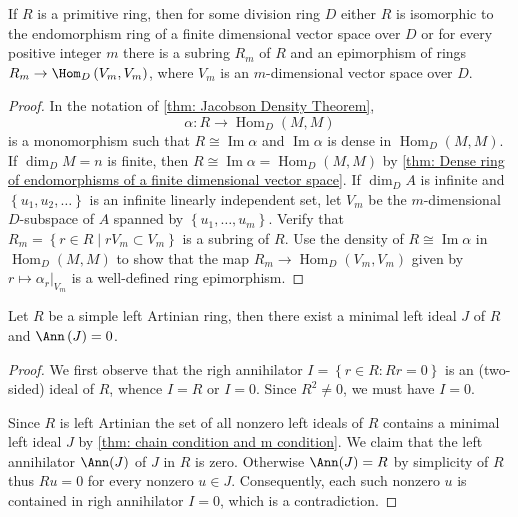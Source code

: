 \begin{corollary}
    \label{cor: Structure of primitive rings}
    If $R$ is a primitive ring, then for some division ring $D$ either $R$ is isomorphic to the endomorphism ring of a finite dimensional vector space over $D$
    or
    for every positive integer $m$ there is a subring $R_{m}$ of $R$ and an epimorphism of rings $R_{m} \rightarrow \Hom_{D}\left(V_{m}, V_{m}\right)$, where $V_{m}$ is an $m$-dimensional vector space over $D$.

    \begin{proof}
        In the notation of \ref{thm: Jacobson Density Theorem},
        \begin{equation*}
            \alpha: R \rightarrow \operatorname{Hom}_D(M, M)
        \end{equation*}
        is a monomorphism such that $R\cong\operatorname{Im} \alpha$ and $\operatorname{Im} \alpha$ is dense in $\operatorname{Hom}_D(M, M)$.
        If $\operatorname{dim}_D M=n$ is finite, then $R\cong \operatorname{Im} \alpha=\operatorname{Hom}_D(M, M)$ by \ref{thm: Dense ring of endomorphisms of a finite dimensional vector space}.
        If $\operatorname{dim}_D A$ is infinite and $\left\{u_1, u_2, \ldots\right\}$ is an infinite linearly independent set, let $V_m$ be the $m$-dimensional $D$-subspace of $A$ spanned by $\left\{u_1, \ldots, u_m\right\}$.
        Verify that $R_m=\left\{r \in R \mid r V_m \subset V_m\right\}$ is a subring of $R$.
        Use the density of $R \cong \operatorname{Im} \alpha$ in $\operatorname{Hom}_D(M, M)$ to show that the map $R_m \rightarrow \operatorname{Hom}_D\left(V_m, V_m\right)$ given by $r \mapsto \left. \alpha_r \right|_{V_m}$ is a well-defined ring epimorphism.
    \end{proof}
\end{corollary}



\begin{lemma}
    \label{lem: Lemma of Wedderburn-Artin}
    Let $R$ be a simple left Artinian ring, then there exist a minimal left ideal $J$ of $R$ and $\Ann\left( J \right)=0$.

    \begin{proof}
        We first observe that the righ annihilator $I=\left\{r \in R : R r=0\right\}$ is an (two-sided) ideal of $R$, whence $I=R$ or $I=0$. Since $R^2 \neq 0$, we must have $I=0$.

        Since $R$ is left Artinian the set of all nonzero left ideals of $R$ contains a minimal left ideal $J$ by \ref{thm: chain condition and m condition}.
        We claim that the left annihilator $\Ann(J)$ of $J$ in $R$ is zero. Otherwise $\Ann(J)=R$ by simplicity of $R$ thus $R u=0$ for every nonzero $u \in J$.
        Consequently, each such nonzero $u$ is contained in righ annihilator $I=0$, which is a contradiction.
    \end{proof}
\end{lemma}


